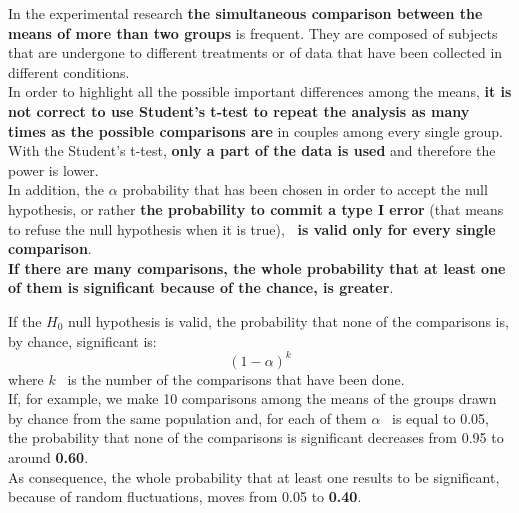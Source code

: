 
\begin{frame}
  \begin{small}
    \vspace*{.1cm}
    In the experimental research \textbf{the simultaneous comparison between the means of more than two groups} is frequent. They are composed of subjects that are undergone to different treatments or of data that have been collected in different conditions.\\
    \vspace*{.1cm}
    In order to highlight all the possible important differences among the means, \textbf{it is not correct to use Student's t-test to repeat the analysis as many times as the possible comparisons are} in couples among every single group.\\
    \vspace*{.1cm}
    With the Student's t-test, \textbf{only a part of the data is used} and therefore the power is lower.\\
    \vspace*{.1cm}
    In addition, the $ \alpha $ probability that has been chosen in order to accept the null hypothesis, or rather \textbf{the probability to commit a type I error} (that means to refuse the null hypothesis when it is true), \textbf{\ is valid only for every single comparison}.\\
    \vspace*{.1cm}
    \textbf{If there are many comparisons, the whole probability that at least one of them is significant because of the chance, is greater}.
  \end{small}
\end{frame}

\begin{frame}
  \vspace*{.25cm}
  If the $ H_0 $ null hypothesis is valid, the probability that none of the comparisons is, by chance, significant is:
  $$ (1-\alpha)^k $$
  where $ k $ \ is the number of the comparisons that have been done.\\
  \vspace*{.5cm}
  If, for example, we make 10 comparisons among the means of the groups drawn by chance from the same population and, for each of them $ \alpha $ \ is equal to 0.05, the probability that none of the comparisons is significant decreases from 0.95 to around \textbf{0.60}.\\
  \vspace*{.5cm}
  As consequence, the whole probability that at least one results to be significant, because of random fluctuations, moves from 0.05 to \textbf{0.40}.
\end{frame}

